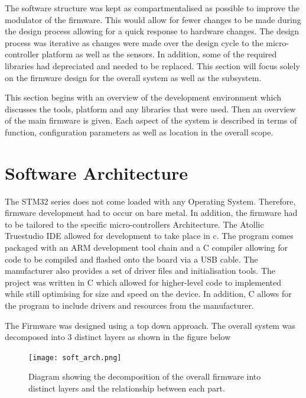 The software structure was kept as compartmentalised as possible to improve the modulator of the firmware. This would allow for fewer changes to be made during the design process allowing for a quick response to hardware changes. The design process was iterative as changes were made over the design cycle to the micro-controller platform as well as the sensors. In addition, some of the required libraries had depreciated and needed to be replaced.  This section will focus solely on the firmware design for the overall system as well as the subsystem. 

This section begins with an overview of the development environment which discusses the tools, platform and any libraries that were used. Then an overview of the main firmware is given. Each aspect of the system is described in terms of function, configuration parameters as well as location in the overall scope.

\section{Software Architecture}

The STM32 series does not come loaded with any Operating System. Therefore, firmware development had to occur on bare metal. In addition, the firmware had to be tailored to the specific micro-controllers Architecture. The Atollic Truestudio IDE allowed for development to take place in c. The program comes packaged with an ARM development tool chain and a C compiler allowing for code to be compiled and flashed onto the board via a USB cable. The manufacturer also provides a set of driver files and  initialisation tools. The project was written in C which allowed for higher-level code to implemented while still optimising for size and speed on the device. In addition, C allows for the program to include drivers and resources from the manufacturer. \par 

The Firmware was designed using a top down approach. The overall system was decomposed into 3 distinct layers as shown in the figure below

\begin{figure}[H]
    \centering
    \texttt{[image: soft\_arch.png]}
    \caption{Diagram showing the decomposition of the overall firmware into distinct layers and the relationship between each part.}
    \label{fig:soft_arch}
\end{figure}

